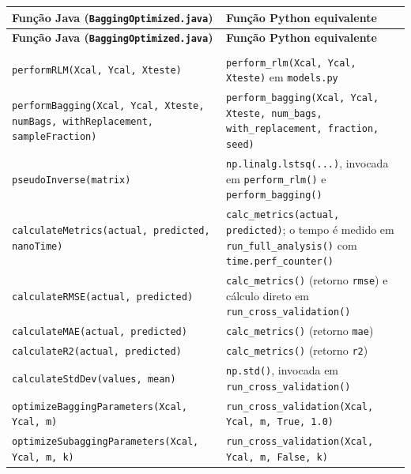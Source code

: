 \begin{longtable}{|>{\raggedright\arraybackslash}p{}|>{\raggedright\arraybackslash}p{}|}
\hline
\textbf{Função Java (\texttt{BaggingOptimized.java})} & \textbf{Função Python equivalente} \\ \hline
\endfirsthead

\hline
\textbf{Função Java (\texttt{BaggingOptimized.java})} & \textbf{Função Python equivalente} \\ \hline
\endhead

\hline
\multicolumn{2}{r}{\footnotesize\textit{Continua na próxima página}} \\
\endfoot

\hline
\endlastfoot

\texttt{performRLM(Xcal, Ycal, Xteste)} & \texttt{perform\_rlm(Xcal, Ycal, Xteste)} em \texttt{models.py} \\ \hline
\texttt{performBagging(Xcal, Ycal, Xteste, numBags, withReplacement, sampleFraction)} & \texttt{perform\_bagging(Xcal, Ycal, Xteste, num\_bags, with\_replacement, fraction, seed)} \\ \hline
\texttt{pseudoInverse(matrix)} & \texttt{np.linalg.lstsq(...)}, invocada em \texttt{perform\_rlm()} e \texttt{perform\_bagging()} \\ \hline
\texttt{calculateMetrics(actual, predicted, nanoTime)} & \texttt{calc\_metrics(actual, predicted)}; o tempo é medido em \texttt{run\_full\_analysis()} com \texttt{time.perf\_counter()} \\ \hline
\texttt{calculateRMSE(actual, predicted)} & \texttt{calc\_metrics()} (retorno \texttt{rmse}) e cálculo direto em \texttt{run\_cross\_validation()} \\ \hline
\texttt{calculateMAE(actual, predicted)} & \texttt{calc\_metrics()} (retorno \texttt{mae}) \\ \hline
\texttt{calculateR2(actual, predicted)} & \texttt{calc\_metrics()} (retorno \texttt{r2}) \\ \hline
\texttt{calculateStdDev(values, mean)} & \texttt{np.std()}, invocada em \texttt{run\_cross\_validation()} \\ \hline
\texttt{optimizeBaggingParameters(Xcal, Ycal, m)} & \texttt{run\_cross\_validation(Xcal, Ycal, m, True, 1.0)} \\ \hline
\texttt{optimizeSubaggingParameters(Xcal, Ycal, m, k)} & \texttt{run\_cross\_validation(Xcal, Ycal, m, False, k)} \\ \hline

\end{longtable}
